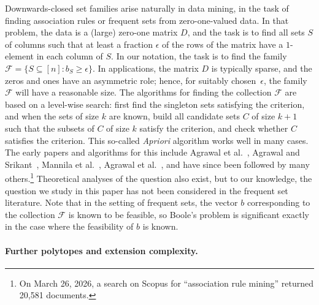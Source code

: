 \documentclass[11pt]{article}
\begin{document}
Downwards-closed set families arise naturally in data mining, in the task of finding association rules or frequent sets from zero-one-valued data. 
In that problem, the data is a (large) zero-one matrix $D$, and the task is to find all sets $S$ of columns such that at least a fraction $\epsilon$ of the rows of the matrix have a $1$-element in each column of $S$. In our notation, the task is to find the family $\mathcal{F} = \{ S \subseteq [n] : b_S \geq \epsilon \}$. In applications, the matrix $D$ is typically sparse, and the zeros and ones have an asymmetric role; hence, for suitably chosen~$\epsilon$, the family $\mathcal{F}$ will have a reasonable size. The algorithms for finding the collection $\mathcal{F}$ are based on a level-wise search: first find the singleton sets satisfying the criterion, and when the sets of size $k$ are known, build all candidate sets $C$ of size $k+1$ such that the subsets of $C$ of size $k$ satisfy the criterion, and check whether $C$ satisfies the criterion. This so-called {\em Apriori} algorithm works well in many cases. The early papers and algorithms for this include Agrawal et al.~\cite{AgrawalS1993}, Agrawal and Srikant~\cite{AgrawalS1994}, Mannila et al.~\cite{MannilaT1994}, Agrawal et al.~\cite{AgrawalM1996}, and have since been followed by many others.\footnote{On March 26, 2026, a search on Scopus for ``association rule mining'' returned 20,581 documents.} Theoretical analyses of the question also exist, but to our knowledge, the question we study in this paper has not been considered in the frequent set literature. Note that in the setting of frequent sets, the vector $b$ corresponding to the collection $\mathcal{F}$ is known to be feasible, so Boole’s problem is significant exactly in the case where the feasibility of $b$ is known.

\paragraph*{Further polytopes and extension complexity.}
\end{document}
